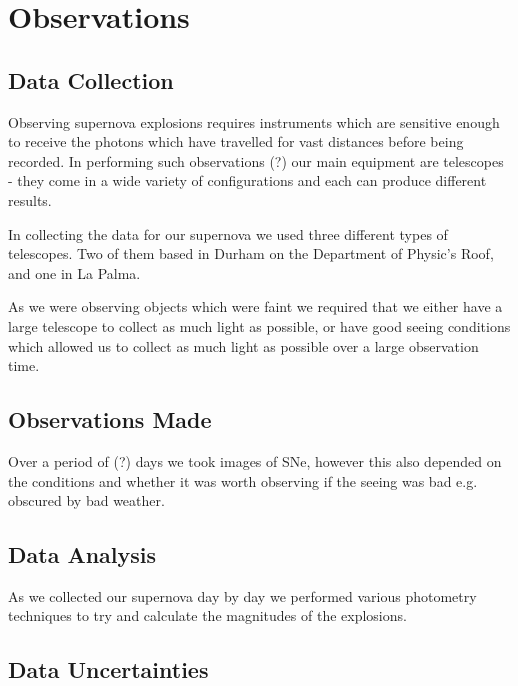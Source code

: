 \documentclass[twocolumn]{revtex4}
\begin{document}
\section{Observations} 
\vspace{-2ex}
\subsection{Data Collection}
\vspace{-2ex}

Observing supernova explosions requires instruments which are sensitive enough to receive the photons which have travelled for vast distances before being recorded. In performing such observations (?) our main equipment are telescopes - they come in a wide variety of configurations and each can produce different results.

In collecting the data for our supernova we used three different types of telescopes. Two of them based in Durham on the Department of Physic's Roof, and one in La Palma. 

As we were observing objects which were faint we required that we either have a large telescope to collect as much light as possible, or have good seeing conditions which allowed us to collect as much light as possible over a large observation time.

\vspace{-3ex}
\subsection{Observations Made}
\vspace{-2ex}

Over a period of (?) days we took images of SNe, however this also depended on the conditions and whether it was worth observing if the seeing was bad e.g. obscured by bad weather.

\vspace{-3ex}
\subsection{Data Analysis}
\vspace{-2ex}

As we collected our supernova day by day we performed various photometry techniques to try and calculate the magnitudes of the explosions. 

\vspace{-3ex}
\subsection{Data Uncertainties}
\vspace{-2ex}
\end{document}
